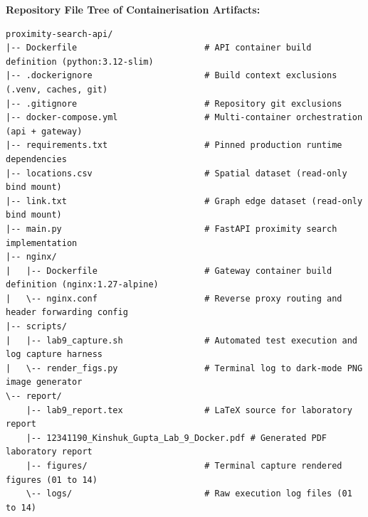 \documentclass[10pt,a4paper]{article}
\begin{document}
\vspace{0.4em}
\noindent
\textbf{Repository File Tree of Containerisation Artifacts:}
\begin{lstlisting}
proximity-search-api/
|-- Dockerfile                         # API container build definition (python:3.12-slim)
|-- .dockerignore                      # Build context exclusions (.venv, caches, git)
|-- .gitignore                         # Repository git exclusions
|-- docker-compose.yml                 # Multi-container orchestration (api + gateway)
|-- requirements.txt                   # Pinned production runtime dependencies
|-- locations.csv                      # Spatial dataset (read-only bind mount)
|-- link.txt                           # Graph edge dataset (read-only bind mount)
|-- main.py                            # FastAPI proximity search implementation
|-- nginx/
|   |-- Dockerfile                     # Gateway container build definition (nginx:1.27-alpine)
|   \-- nginx.conf                     # Reverse proxy routing and header forwarding config
|-- scripts/
|   |-- lab9_capture.sh                # Automated test execution and log capture harness
|   \-- render_figs.py                 # Terminal log to dark-mode PNG image generator
\-- report/
    |-- lab9_report.tex                # LaTeX source for laboratory report
    |-- 12341190_Kinshuk_Gupta_Lab_9_Docker.pdf # Generated PDF laboratory report
    |-- figures/                       # Terminal capture rendered figures (01 to 14)
    \-- logs/                          # Raw execution log files (01 to 14)
\end{lstlisting}
\end{document}
